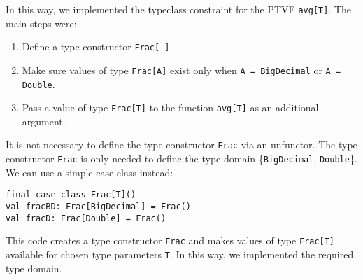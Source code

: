 In this way, we implemented the typeclass constraint for the PTVF
\lstinline!avg[T]!. The main steps were:
\begin{enumerate}
\item Define a type constructor \lstinline!Frac[_]!.
\item Make sure values of type \lstinline!Frac[A]! exist only when \lstinline!A = BigDecimal!
or \lstinline!A = Double!.
\item Pass a value of type \lstinline!Frac[T]! to the function \lstinline!avg[T]!
as an additional argument.
\end{enumerate}
It is not necessary to define the type constructor \lstinline!Frac!
via an unfunctor. The type constructor \lstinline!Frac! is only needed
to define the type domain \{\lstinline!BigDecimal!, \lstinline!Double!\}.
We can use a simple case class instead:
\begin{lstlisting}
final case class Frac[T]()
val fracBD: Frac[BigDecimal] = Frac()
val fracD: Frac[Double] = Frac()
\end{lstlisting}

\noindent This code creates a type constructor \lstinline!Frac! and
makes values of type \lstinline!Frac[T]! available for chosen type
parameters \lstinline!T!. In this way, we implemented the required
type domain.

